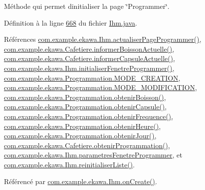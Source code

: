 Méthode qui permet d\textquotesingle{}initialiser la page \char`\"{}\+Programmer\char`\"{}. 



Définition à la ligne \hyperlink{_ihm_8java_source_l00668}{668} du fichier \hyperlink{_ihm_8java_source}{Ihm.\+java}.



Références \hyperlink{_ihm_8java_source_l00938}{com.\+example.\+ekawa.\+Ihm.\+actualiser\+Page\+Programmer()}, \hyperlink{_cafetiere_8java_source_l00245}{com.\+example.\+ekawa.\+Cafetiere.\+informer\+Boisson\+Actuelle()}, \hyperlink{_cafetiere_8java_source_l00235}{com.\+example.\+ekawa.\+Cafetiere.\+informer\+Capsule\+Actuelle()}, \hyperlink{_ihm_8java_source_l00727}{com.\+example.\+ekawa.\+Ihm.\+initialiser\+Fenetre\+Programmer()}, \hyperlink{_programmation_8java_source_l00033}{com.\+example.\+ekawa.\+Programmation.\+M\+O\+D\+E\+\_\+\+C\+R\+E\+A\+T\+I\+ON}, \hyperlink{_programmation_8java_source_l00034}{com.\+example.\+ekawa.\+Programmation.\+M\+O\+D\+E\+\_\+\+M\+O\+D\+I\+F\+I\+C\+A\+T\+I\+ON}, \hyperlink{_programmation_8java_source_l00133}{com.\+example.\+ekawa.\+Programmation.\+obtenir\+Boisson()}, \hyperlink{_programmation_8java_source_l00124}{com.\+example.\+ekawa.\+Programmation.\+obtenir\+Capsule()}, \hyperlink{_programmation_8java_source_l00160}{com.\+example.\+ekawa.\+Programmation.\+obtenir\+Frequence()}, \hyperlink{_programmation_8java_source_l00151}{com.\+example.\+ekawa.\+Programmation.\+obtenir\+Heure()}, \hyperlink{_programmation_8java_source_l00142}{com.\+example.\+ekawa.\+Programmation.\+obtenir\+Jour()}, \hyperlink{_cafetiere_8java_source_l00856}{com.\+example.\+ekawa.\+Cafetiere.\+obtenir\+Programmation()}, \hyperlink{_ihm_8java_source_l00137}{com.\+example.\+ekawa.\+Ihm.\+parametres\+Fenetre\+Programmer}, et \hyperlink{_ihm_8java_source_l00974}{com.\+example.\+ekawa.\+Ihm.\+reinitialiser\+Liste()}.



Référencé par \hyperlink{_ihm_8java_source_l00248}{com.\+example.\+ekawa.\+Ihm.\+on\+Create()}.



